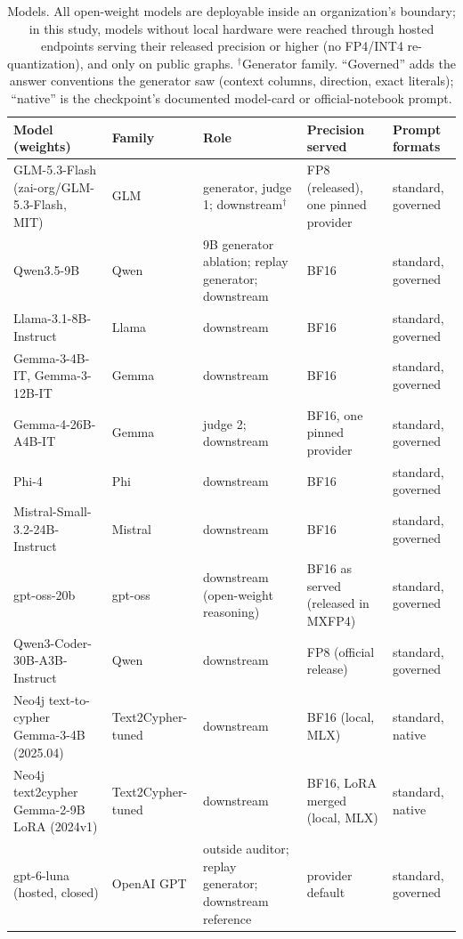 \begin{table}[!t]
\centering
\footnotesize
\setlength{\tabcolsep}{4pt}
\begin{tabular}{@{}>{\raggedright\arraybackslash}p{4.3cm}>{\raggedright\arraybackslash}p{1.9cm}>{\raggedright\arraybackslash}p{3.85cm}>{\raggedright\arraybackslash}p{3.1cm}>{\raggedright\arraybackslash}p{1.7cm}@{}}
\toprule
Model (weights) & Family & Role & Precision served & Prompt formats \\
\midrule
GLM-5.3-Flash (zai-org/GLM-5.3-Flash, MIT) & GLM & generator, judge 1; downstream$^\dagger$ & FP8 (released), one pinned provider & standard, governed \\
Qwen3.5-9B & Qwen & 9B generator ablation; replay generator; downstream & BF16 & standard, governed \\
Llama-3.1-8B-Instruct & Llama & downstream & BF16 & standard, governed \\
Gemma-3-4B-IT, Gemma-3-12B-IT & Gemma & downstream & BF16 & standard, governed \\
Gemma-4-26B-A4B-IT & Gemma & judge 2; downstream & BF16, one pinned provider & standard, governed \\
Phi-4 & Phi & downstream & BF16 & standard, governed \\
Mistral-Small-3.2-24B-Instruct & Mistral & downstream & BF16 & standard, governed \\
gpt-oss-20b & gpt-oss & downstream (open-weight reasoning) & BF16 as served (released in MXFP4) & standard, governed \\
Qwen3-Coder-30B-A3B-Instruct & Qwen & downstream & FP8 (official release) & standard, governed \\
Neo4j text-to-cypher Gemma-3-4B (2025.04) & Text2Cypher-tuned & downstream & BF16 (local, MLX) & standard, native \\
Neo4j text2cypher Gemma-2-9B LoRA (2024v1) & Text2Cypher-tuned & downstream & BF16, LoRA merged (local, MLX) & standard, native \\
gpt-6-luna (hosted, closed) & OpenAI GPT & outside auditor; replay generator; downstream reference & provider default & standard, governed \\
\bottomrule
\end{tabular}
\caption{Models. All open-weight models are deployable inside an organization's boundary; in this study, models without local hardware were reached through hosted endpoints serving their released precision or higher (no FP4/INT4 re-quantization), and only on public graphs. $^\dagger$Generator family. ``Governed'' adds the answer conventions the generator saw (context columns, direction, exact literals); ``native'' is the checkpoint's documented model-card or official-notebook prompt.}
\label{tab:models}
\end{table}

